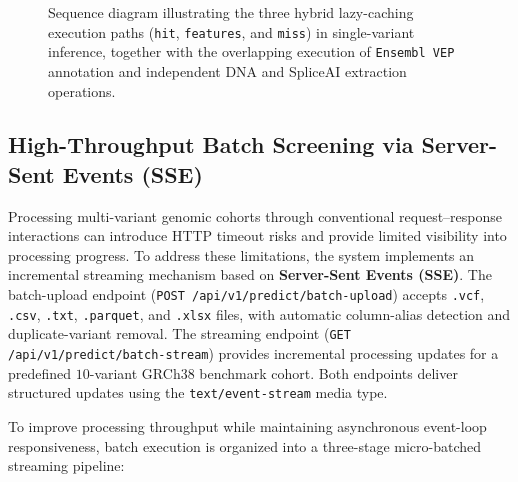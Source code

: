 \begin{figure}[htbp]
    \centering
    \caption{Sequence diagram illustrating the three hybrid lazy-caching execution paths (\texttt{hit}, \texttt{features}, and \texttt{miss}) in single-variant inference, together with the overlapping execution of \texttt{Ensembl VEP} annotation and independent DNA and SpliceAI extraction operations.}
    \label{fig:single_sequence}
\end{figure}

\subsection{High-Throughput Batch Screening via Server-Sent Events (SSE)}

Processing multi-variant genomic cohorts through conventional request--response interactions can introduce HTTP timeout risks and provide limited visibility into processing progress. To address these limitations, the system implements an incremental streaming mechanism based on \textbf{Server-Sent Events (SSE)}. The batch-upload endpoint (\texttt{POST /api/v1/predict/batch-upload}) accepts \texttt{.vcf}, \texttt{.csv}, \texttt{.txt}, \texttt{.parquet}, and \texttt{.xlsx} files, with automatic column-alias detection and duplicate-variant removal. The streaming endpoint (\texttt{GET /api/v1/predict/batch-stream}) provides incremental processing updates for a predefined $10$-variant GRCh38 benchmark cohort. Both endpoints deliver structured updates using the \texttt{text/event-stream} media type.

To improve processing throughput while maintaining asynchronous event-loop responsiveness, batch execution is organized into a three-stage micro-batched streaming pipeline:

